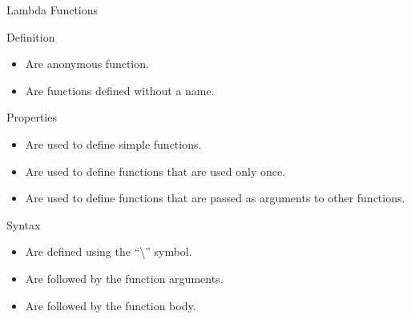 \begin{frame}{Lambda Functions}
    \begin{block}{Definition}
        \begin{itemize}
            \item Are anonymous function.
            \item Are functions defined without a name.
        \end{itemize}
    \end{block}
    \begin{block}{Properties}
        \begin{itemize}
            \item Are used to define simple functions.
            \item Are used to define functions that are used only once.
            \item Are used to define functions that are passed as arguments to other functions.
        \end{itemize}
    \end{block}
    \begin{block}{Syntax}
        \begin{itemize}
            \item Are defined using the ``\textbackslash'' symbol.
            \item Are followed by the function arguments.
            \item Are followed by the function body.
        \end{itemize}
    \end{block}
\end{frame}